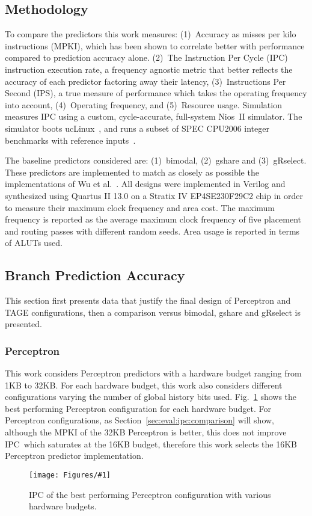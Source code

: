 \documentclass[conference]{IEEEtran}
\newcommand{\kfig}[4]{ %
        \begin{figure}[!t]
        \centering
        \texttt{[image: Figures/\#1]}
        \vspace{-1mm}
        \caption{#3}
        \label{#2}
        \end{figure}
}
\begin{document}
\subsection{Methodology}
\label{sec:eval:methodology}
To compare the predictors this work measures: (1)~Accuracy as misses per kilo instructions (MPKI), which has been shown to correlate better with performance compared to prediction accuracy alone. (2)~The Instruction Per Cycle (IPC) instruction execution rate, a frequency agnostic metric that better reflects the accuracy of each predictor factoring away their latency, (3)~Instructions Per Second (IPS), a true measure of performance which takes the operating frequency into account, (4)~Operating frequency, and (5)~Resource usage. Simulation measures IPC using a custom, cycle-accurate, full-system Nios~II simulator. The simulator boots ucLinux~\cite{uclinux}, and runs a subset of SPEC CPU2006 integer benchmarks with reference inputs~\cite{spec2k6}.

The baseline predictors considered are: (1)~bimodal, (2)~gshare and (3)~gRselect. These predictors are implemented to match as closely as possible the implementations of Wu et al.~\cite{grselect}. All designs were implemented in Verilog and synthesized using Quartus II 13.0 on a Stratix IV EP4SE230F29C2 chip in order to measure their maximum clock frequency and area cost. The maximum frequency is reported as the average maximum clock frequency of five placement and routing passes with different random seeds. Area usage is reported in terms of ALUTs used.

\subsection{Branch Prediction Accuracy}
\label{sec:eval:ipc}
This section first presents data that justify the final design of Perceptron and TAGE configurations, then a comparison versus bimodal, gshare and gRselect is presented.

\subsubsection{Perceptron}
\label{sec:eval:ipc:perceptron}
This work considers Perceptron predictors with a hardware budget ranging from 1KB to 32KB. For each hardware budget, this work also considers different configurations varying the number of global history bits used. Fig.~\ref{fig:perceptronIPC} shows the best performing Perceptron configuration for each hardware budget. For Perceptron configurations, as Section~\ref{sec:eval:ipc:comparison} will show, although the MPKI of the 32KB Perceptron is better, this does not improve IPC\ which saturates at the 16KB budget, therefore this work selects the 16KB Perceptron predictor implementation.
\kfig{perceptronIPC.pdf}{fig:perceptronIPC}{IPC of the best performing Perceptron configuration with various hardware budgets.}{angle = 0, trim = 0.9in 4.5in 0.8in 5in, clip, width=0.4\textwidth}
\end{document}
